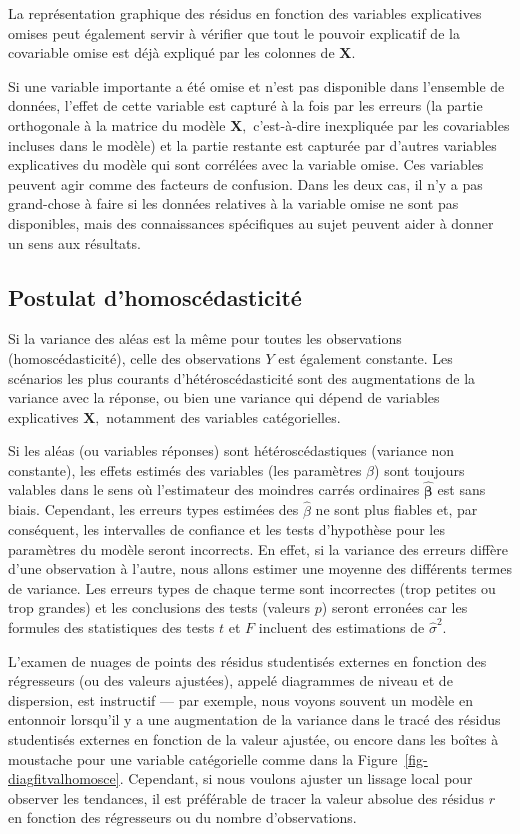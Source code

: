 \documentclass[
  11pt,
  letterpaper,
]{scrbook}
\theoremstyle{plain}
\theoremstyle{plain}
\theoremstyle{definition}
\theoremstyle{definition}
\theoremstyle{remark}
\begin{document}
La représentation graphique des résidus en fonction des variables
explicatives omises peut également servir à vérifier que tout le pouvoir
explicatif de la covariable omise est déjà expliqué par les colonnes de
\(\mathbf{X}.\)

Si une variable importante a été omise et n'est pas disponible dans
l'ensemble de données, l'effet de cette variable est capturé à la fois
par les erreurs (la partie orthogonale à la matrice du modèle
\(\mathbf{X},\) c'est-à-dire inexpliquée par les covariables incluses
dans le modèle) et la partie restante est capturée par d'autres
variables explicatives du modèle qui sont corrélées avec la variable
omise. Ces variables peuvent agir comme des facteurs de confusion. Dans
les deux cas, il n'y a pas grand-chose à faire si les données relatives
à la variable omise ne sont pas disponibles, mais des connaissances
spécifiques au sujet peuvent aider à donner un sens aux résultats.

\subsection{Postulat
d'homoscédasticité}\label{postulat-dhomoscuxe9dasticituxe9}

Si la variance des aléas est la même pour toutes les observations
(homoscédasticité), celle des observations \(Y\) est également
constante. Les scénarios les plus courants d'hétéroscédasticité sont des
augmentations de la variance avec la réponse, ou bien une variance qui
dépend de variables explicatives \(\mathbf{X},\) notamment des variables
catégorielles.

Si les aléas (ou variables réponses) sont hétéroscédastiques (variance
non constante), les effets estimés des variables (les paramètres
\(\beta\)) sont toujours valables dans le sens où l'estimateur des
moindres carrés ordinaires \(\widehat{\boldsymbol{\beta}}\) est sans
biais. Cependant, les erreurs types estimées des \(\widehat{\beta}\) ne
sont plus fiables et, par conséquent, les intervalles de confiance et
les tests d'hypothèse pour les paramètres du modèle seront incorrects.
En effet, si la variance des erreurs diffère d'une observation à
l'autre, nous allons estimer une moyenne des différents termes de
variance. Les erreurs types de chaque terme sont incorrectes (trop
petites ou trop grandes) et les conclusions des tests (valeurs \(p\))
seront erronées car les formules des statistiques des tests \(t\) et
\(F\) incluent des estimations de \(\widehat{\sigma}^2.\)

L'examen de nuages de points des résidus studentisés externes en
fonction des régresseurs (ou des valeurs ajustées), appelé diagrammes de
niveau et de dispersion, est instructif --- par exemple, nous voyons
souvent un modèle en entonnoir lorsqu'il y a une augmentation de la
variance dans le tracé des résidus studentisés externes en fonction de
la valeur ajustée, ou encore dans les boîtes à moustache pour une
variable catégorielle comme dans la Figure~\ref{fig-diagfitvalhomosce}.
Cependant, si nous voulons ajuster un lissage local pour observer les
tendances, il est préférable de tracer la valeur absolue des résidus
\(r\) en fonction des régresseurs ou du nombre d'observations.
\end{document}
